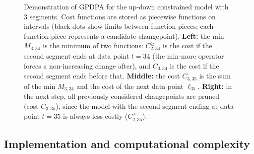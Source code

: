 \documentclass[twoside,11pt]{article}
\begin{document}
\begin{figure}[t!]
  \centering
  
\vskip -1cm
  \caption{
    Demonstration of GPDPA for the up-down constrained model
    with $3$ segments. Cost functions are stored as piecewise
    functions on intervals (black dots show limits between function
    pieces; each function piece represents a candidate changepoint). 
    \textbf{Left:} the min \textcolor{Min}{$M_{3,34}$} is the
    minimum of two functions: \textcolor{MinMore}{$C^{\geq}_{2,34}$}
    is the cost if the second segment ends at data point $t=34$ (the
    min-more operator forces a non-increasing change after), and
    \textcolor{Ckt}{$C_{3,34}$} is the cost if the second segment ends
    before that. \textbf{Middle:} the cost \textcolor{Ckt}{$C_{3,35}$}
    is the sum of the min \textcolor{Min}{$M_{3,34}$} and the cost of
    the next data point \textcolor{Data}{$\ell_{35}$}. \textbf{Right:}
    in the next step, all previously considered changepoints are
    pruned (cost \textcolor{Ckt}{$C_{3,35}$}), since the model with the second
    segment ending at data point $t=35$ is always less costly
    (\textcolor{MinMore}{$C^{\geq}_{2,35}$}).  }
  \label{fig:min-envelope}
\end{figure}

\subsection{Implementation and computational complexity}
\label{sec:implementation}
\end{document}
